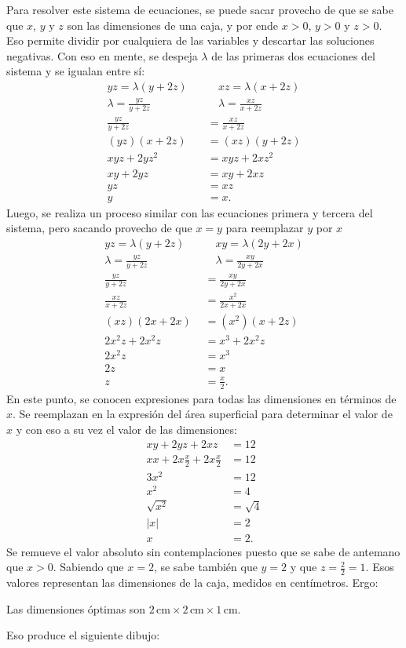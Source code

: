 \documentclass{fmbvecto}
\begin{document}
\begin{problema}
Para resolver este sistema de ecuaciones, se puede sacar provecho de que se sabe que \(x\), \(y\) y \(z\) son las dimensiones de una caja, y por ende \(x > 0\), \(y > 0\) y \(z > 0\). Eso permite dividir por cualquiera de las variables y descartar las soluciones negativas. Con eso en mente, se despeja \(\lambda\) de las primeras dos ecuaciones del sistema y se igualan entre sí:
\begin{align*}
    yz = \lambda(y + 2z) \quad & \quad  xz = \lambda(x + 2z)\\
    \lambda = \frac{yz}{y + 2z} \quad & \quad  \lambda = \frac{xz}{x + 2z}\\
    \frac{yz}{y + 2z} &= \frac{xz}{x + 2z}\\
    (yz)(x + 2z) &= (xz)(y + 2z) \\
    xyz + 2yz^2 &= xyz + 2xz^2 \\
    xy + 2yz &= xy + 2xz \\
    yz &=  xz \\
    y &=  x.
\end{align*}
Luego, se realiza un proceso similar con las ecuaciones primera y tercera del sistema, pero sacando provecho de que \(x=y\) para reemplazar \(y\) por \(x\)
\begin{align*}
    yz = \lambda(y + 2z) \quad & \quad  xy = \lambda(2y + 2x)\\
    \lambda = \frac{yz}{y + 2z} \quad & \quad  \lambda = \frac{xy}{2y + 2x}\\
    \frac{yz}{y + 2z} &= \frac{xy}{2y + 2x}\\
    \frac{xz}{x + 2z} &= \frac{x^2}{2x + 2x}\\
    (xz)(2x + 2x) &= (x^2)(x + 2z)\\
    2x^2z + 2x^2z &= x^3 + 2x^2z\\
    2x^2z &= x^3 \\
    2z &= x \\
    z &= \frac{x}{2}.
\end{align*}
En este punto, se conocen expresiones para todas las dimensiones en términos de \(x\). Se reemplazan en la expresión del área superficial para determinar el valor de \(x\) y con eso a su vez el valor de las dimensiones:
\begin{align*}
    xy + 2yz + 2xz &= 12 \\
    xx + 2x\frac{x}{2} + 2x\frac{x}{2} &= 12 \\
    3x^2 &= 12 \\
    x^2 &= 4 \\
    \sqrt{x^2} &= \sqrt{4} \\
    |x| &= 2 \\
    x &= 2.
\end{align*}
Se remueve el valor absoluto sin contemplaciones puesto que se sabe de antemano que \(x > 0\). Sabiendo que \(x = 2\), se sabe también que \(y = 2\) y que \(z = \frac{2}{2} = 1\). Esos valores representan las dimensiones de la caja, medidos en centímetros. Ergo:
\begin{gbox}
    Las dimensiones óptimas son \(2 \, \text{cm} \times 2 \, \text{cm} \times 1 \, \text{cm} \).
\end{gbox}
Eso produce el siguiente dibujo:


\end{problema}
\end{document}
